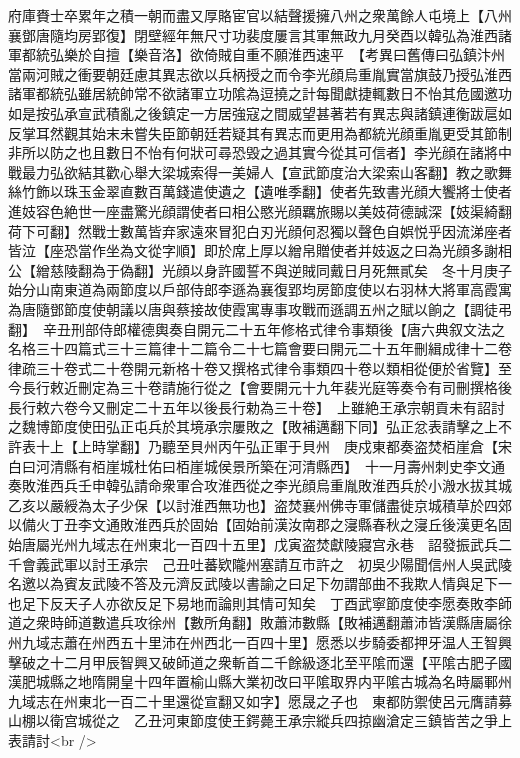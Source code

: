 府庫賚士卒累年之積一朝而盡又厚賂宦官以結聲援擁八州之衆萬餘人屯境上【八州襄鄧唐隨均房郢復】閉壁經年無尺寸功裴度屢言其軍無政九月癸酉以韓弘為淮西諸軍都統弘樂於自擅【樂音洛】欲倚賊自重不願淮西速平　【考異曰舊傳曰弘鎮汴州當兩河賊之衝要朝廷慮其異志欲以兵柄授之而令李光顔烏重胤實當旗鼓乃授弘淮西諸軍都統弘雖居統帥常不欲諸軍立功隂為逗撓之計每聞獻捷輒數日不怡其危國邀功如是按弘承宣武積亂之後鎮定一方居強寇之間威望甚著若有異志與諸鎮連衡跋扈如反掌耳然觀其始末未嘗失臣節朝廷若疑其有異志而更用為都統光顔重胤更受其節制非所以防之也且數日不怡有何狀可尋恐毁之過其實今從其可信者】李光顔在諸將中戰最力弘欲結其歡心舉大梁城索得一美婦人【宣武節度治大梁索山客翻】教之歌舞絲竹飾以珠玉金翠直數百萬錢遣使遺之【遺唯季翻】使者先致書光顔大饗將士使者進妓容色絶世一座盡驚光顔謂使者曰相公愍光顔羈旅賜以美妓荷德誠深【妓渠綺翻荷下可翻】然戰士數萬皆弃家遠來冒犯白刃光顔何忍獨以聲色自娯悦乎因流涕座者皆泣【座恐當作坐為文從字順】即於席上厚以繒帛贈使者并妓返之曰為光顔多謝相公【繒慈陵翻為于偽翻】光顔以身許國誓不與逆賊同戴日月死無貳矣　冬十月庚子始分山南東道為兩節度以戶部侍郎李遜為襄復郢均房節度使以右羽林大將軍高霞寓為唐隨鄧節度使朝議以唐與蔡接故使霞寓專事攻戰而遜調五州之賦以餉之【調徒弔翻】　辛丑刑部侍郎權德輿奏自開元二十五年修格式律令事類後【唐六典叙文法之名格三十四篇式三十三篇律十二篇令二十七篇會要曰開元二十五年刪緝成律十二卷律疏三十卷式二十卷開元新格十卷又撰格式律令事類四十卷以類相從便於省覽】至今長行敕近刪定為三十卷請施行從之【會要開元十九年裴光庭等奏令有司刪撰格後長行敕六卷今又刪定二十五年以後長行勅為三十卷】　上雖絶王承宗朝貢未有詔討之魏博節度使田弘正屯兵於其境承宗屢敗之【敗補邁翻下同】弘正忿表請擊之上不許表十上【上時掌翻】乃聽至貝州丙午弘正軍于貝州　庚戍東都奏盗焚栢崖倉【宋白曰河清縣有栢崖城杜佑曰栢崖城侯景所築在河清縣西】　十一月壽州刺史李文通奏敗淮西兵壬申韓弘請命衆軍合攻淮西從之李光顔烏重胤敗淮西兵於小溵水拔其城乙亥以嚴綬為太子少保【以討淮西無功也】盗焚襄州佛寺軍儲盡徙京城積草於四郊以備火丁丑李文通敗淮西兵於固始【固始前漢汝南郡之寖縣春秋之寖丘後漢更名固始唐屬光州九域志在州東北一百四十五里】戊寅盗焚獻陵寢宫永巷　詔發振武兵二千會義武軍以討王承宗　己丑吐蕃欵隴州塞請互市許之　初吳少陽聞信州人吳武陵名邀以為賓友武陵不答及元濟反武陵以書諭之曰足下勿謂部曲不我欺人情與足下一也足下反天子人亦欲反足下易地而論則其情可知矣　丁酉武寧節度使李愿奏敗李師道之衆時師道數遣兵攻徐州【數所角翻】敗蕭沛數縣【敗補邁翻蕭沛皆漢縣唐屬徐州九域志蕭在州西五十里沛在州西北一百四十里】愿悉以步騎委都押牙温人王智興擊破之十二月甲辰智興又破師道之衆斬首二千餘級逐北至平隂而還【平隂古肥子國漢肥城縣之地隋開皇十四年置榆山縣大業初改曰平隂取界内平隂古城為名時屬鄆州九域志在州東北一百二十里還從宣翻又如字】愿晟之子也　東都防禦使呂元膺請募山棚以衛宫城從之　乙丑河東節度使王鍔薨王承宗縱兵四掠幽滄定三鎮皆苦之爭上表請討<br />
